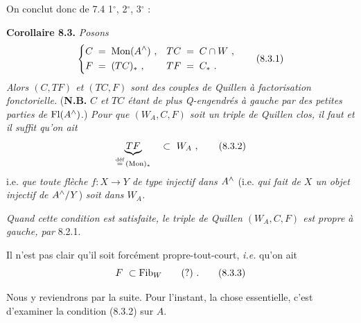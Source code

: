 On conclut donc de 7.4 1$^\circ$, 2$^\circ$, 3$^\circ$ :

\textbf{Corollaire 8.3.} \textit{Posons}
\[
\left\{
\begin{aligned}
C \;&=\; \mathrm{Mon}(A^{\wedge})\ , & TC \;&=\; C\cap W\ ,\\
F \;&=\; (TC)_*\ , & TF \;&=\; C_*\ .
\end{aligned}
\right.
\tag*{(8.3.1)}
\]
\textit{Alors $(C,TF)$ et $(TC,F)$ sont des couples de Quillen à factorisation fonctorielle.} (\textbf{N.B.} \textit{$C$ et $TC$ étant de plus Q-engendrés à gauche par des petites parties de} $\mathrm{Fl}(A^{\wedge})$.) \textit{Pour que $(W_A,C,F)$ soit un triple de Quillen clos, il faut et il suffit qu'on ait}
\[
\underbrace{TF}_{\overset{\text{déf}}{=}\,(\mathrm{Mon})_*} \quad\subset\ W_A\ ,
\tag*{(8.3.2)}
\]
i.e. \textit{que toute flèche $f:X\longrightarrow Y$ de type injectif dans $A^{\wedge}$} (i.e. \textit{qui fait de $X$ un objet injectif de $A^{\wedge}/Y$}) \textit{soit dans $W_A$.}

\textit{Quand cette condition est satisfaite, le triple de Quillen $(W_A,C,F)$ est propre à gauche, par} 8.2.1.

Il n'est pas clair qu'il soit forcément propre-tout-court, \textit{i.e.} qu'on ait
\[
F\ \subset \mathrm{Fib}_W \qquad (?)\ .
\tag*{(8.3.3)}
\]

Nous y reviendrons par la suite. Pour l'instant, la chose essentielle, c'est d'examiner la condition (8.3.2) sur $A$.

